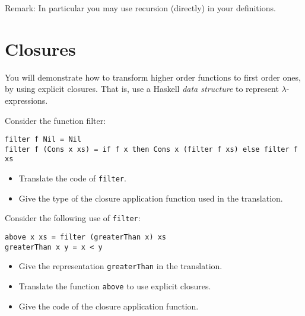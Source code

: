 \documentclass{article}
\newcommand{\answer}[1]{}
\begin{document}
Remark: In particular you may use recursion (directly) in your definitions.

\answer{
  \begin{verbatim}
  foobar = sum . map (\x -> 7*x+2) . filter (>3)
  foobar = fold 0 f where
     f x acc = if x > 3 then 7*x + 2 + acc else acc    
   \end{verbatim}
}


\newpage
\section{Closures}

You will demonstrate how to transform higher order functions to first order ones,
by using explicit closures.  That is, use a Haskell \emph{data
  structure} to represent $\lambda$-expressions.

Consider the function filter:
\begin{verbatim}
filter f Nil = Nil
filter f (Cons x xs) = if f x then Cons x (filter f xs) else filter f xs
\end{verbatim}

\begin{itemize}
\item Translate the code of \texttt{filter}. 
\item Give the type of the closure application function used in the
  translation. 
\end{itemize}

Consider the following use of \texttt{filter}:
\begin{verbatim}
above x xs = filter (greaterThan x) xs
greaterThan x y = x < y
\end{verbatim}

\begin{itemize}
\item Give the representation \texttt{greaterThan} in the translation. 
\item Translate the function \texttt{above} to use explicit closures. 
\item Give the code of the closure application function. 
\end{itemize}

\answer{
1.

  filter f Nil = Nil
  filter f (Cons x xs) = if f `ap` x then Cons x (filter f xs) else filter f xs

2. ap :: Fun -> Int -> Bool

3. 

data Fun = GreaterThan Int 

4. above x y = filter (GreaterThan x) xs

5. ap (GreaterThan x) y = x < y
 
}
\end{document}
